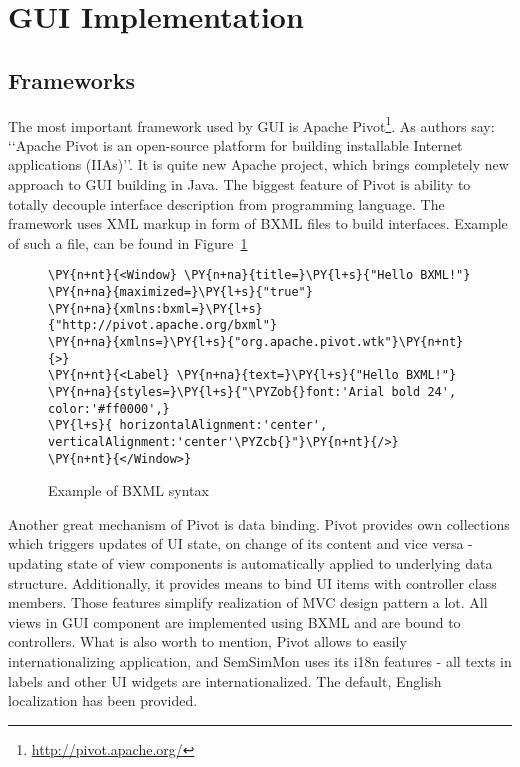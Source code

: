 \section{GUI Implementation}

\subsection{Frameworks}

The most important framework used by GUI is Apache Pivot\footnote{\url{http://pivot.apache.org/}}. As authors say: \lq\lq{}Apache Pivot is an open-source platform for building installable Internet applications (IIAs)\rq\rq{}. It is quite new Apache project, which brings completely new approach to GUI building in Java. The biggest feature of Pivot is ability to totally decouple interface description from programming language. The framework uses XML markup in form of BXML files to build interfaces. Example of such a file, can be found in Figure~\ref{fig:bxml_example}

\begin{figure}[ht]
\centering
\begin{Verbatim}[commandchars=\\\{\},frame=single,framerule=0.2pt] 
\PY{n+nt}{<Window} \PY{n+na}{title=}\PY{l+s}{"Hello BXML!"} \PY{n+na}{maximized=}\PY{l+s}{"true"} 
\PY{n+na}{xmlns:bxml=}\PY{l+s}{"http://pivot.apache.org/bxml"} 
\PY{n+na}{xmlns=}\PY{l+s}{"org.apache.pivot.wtk"}\PY{n+nt}{>} 
\PY{n+nt}{<Label} \PY{n+na}{text=}\PY{l+s}{"Hello BXML!"} 
\PY{n+na}{styles=}\PY{l+s}{"\PYZob{}font:'Arial bold 24', color:'#ff0000',} 
\PY{l+s}{ horizontalAlignment:'center', verticalAlignment:'center'\PYZcb{}"}\PY{n+nt}{/>} 
\PY{n+nt}{</Window>} 
\end{Verbatim} 
\caption{Example of BXML syntax}
\label{fig:bxml_example}
\end{figure}

Another great mechanism of Pivot is data binding. Pivot provides own collections which triggers updates of UI state, on change of its content and vice versa - updating state of view components is automatically applied to underlying data structure. Additionally, it provides means to bind UI items with controller class members. Those features simplify realization of MVC design pattern a lot. All views in GUI component are implemented using BXML and are bound to controllers. What is also worth to mention, Pivot allows to easily internationalizing application, and SemSimMon uses its i18n features - all texts in labels and other UI widgets are internationalized. The default, English localization has been provided.

